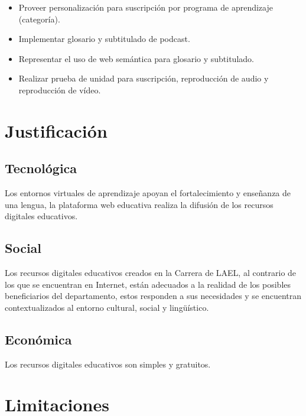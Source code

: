 \begin{itemize}

\item Proveer personalización para suscripción por programa de aprendizaje (categoría).
\item Implementar glosario y subtitulado de podcast.
\item Representar el uso de web semántica para glosario y subtitulado.
\item Realizar prueba de unidad para suscripción, reproducción de audio y
reproducción de vídeo.

\end{itemize}

\section{Justificación} 

\subsection{Tecnológica} 

Los entornos virtuales de aprendizaje apoyan el fortalecimiento y enseñanza de
una lengua, la plataforma web educativa realiza la difusión de los recursos
digitales educativos. 

\subsection{Social}

Los recursos digitales educativos creados en la Carrera de LAEL, al contrario
de los que se encuentran en Internet, están adecuados a la realidad de los
posibles beneficiarios del departamento, estos responden a sus necesidades y
se encuentran contextualizados al entorno cultural, social y lingüístico.

\subsection{Económica}
 
Los recursos digitales educativos son simples y gratuitos.

\section{Limitaciones}

